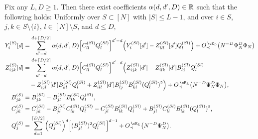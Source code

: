\begin{lemma}
Fix any $L,D \geq 1$. Then there exist coefficients
$\alpha(d,d',D) \in \mathbb{R}$ such that the following holds:
Uniformly over $S \subset [N]$
with $|S| \leq L-1$, and over $i \in S$, $j,k \in S \setminus \{i\}$,
$l \in [N] \setminus S$, and $d \leq D$,
\begin{align}
Y_i^{(S)}[d]&=\sum_{d'=d}^{d+\lceil D/2 \rceil}
\alpha(d,d',D)\Big[C_{ll}^{(Sl)}Q_l^{(Sl)}
\Big]^{d'-d}\Big(Y_i^{(Sl)}[d']-Z_{ill}^{(Sl)}[d']Q_l^{(Sl)}\Big)
+\SDcEL{N^{-D}\Psi_N^D\Phi_N}\label{eq:FAYexpand}\\
Z_{ijk}^{(S)}[d]&=\sum_{d'=d}^{d+\lceil D/2 \rceil}
\alpha(d,d',D)\Big[C_{ll}^{(Sl)}Q_l^{(Sl)}\Big]^{d'-d}
\Big(Z_{ijk}^{(Sl)}[d']-Z_{ilk}^{(Sl)}[d']B_{lj}^{(Sl)}Q_l^{(Sl)}\nonumber\\
&\quad
-Z_{ijl}^{(Sl)}[d']B_{kl}^{(Sl)}Q_l^{(Sl)}+Z_{ill}^{(Sl)}[d']
B_{lj}^{(Sl)}B_{kl}^{(Sl)}(Q_l^{(Sl)})^2\Big)
+\SDcEL{N^{-D}\Psi_N^D\Phi_N},\label{eq:FAZexpand}\\
B_{jk}^{(S)}&=B_{jk}^{(Sl)}-B_{jl}^{(Sl)}B_{lk}^{(Sl)}Q_l^{(Sl)},\label{eq:FABexpand}\\
C_{jk}^{(S)}&=C_{jk}^{(Sl)}-B_{jl}^{(Sl)}C_{lk}^{(Sl)}Q_l^{(Sl)}
-C_{jl}^{(Sl)}B_{lk}^{(Sl)}Q_l^{(Sl)}
+B_{jl}^{(Sl)}C_{ll}^{(Sl)}B_{lk}^{(Sl)}(Q_l^{(Sl)})^2,\label{eq:FACexpand}\\
Q_j^{(S)}&=\sum_{d=1}^{\lceil D/2 \rceil}
\left(Q_j^{(Sl)}\right)^d\left[(B_{jl}^{(Sl)})^2Q_l^{(Sl)}\right]^{d-1}+\SDcEL{N^{-D}\Psi_N^D}.\label{eq:FAQexpand}
\end{align}
\end{lemma}
